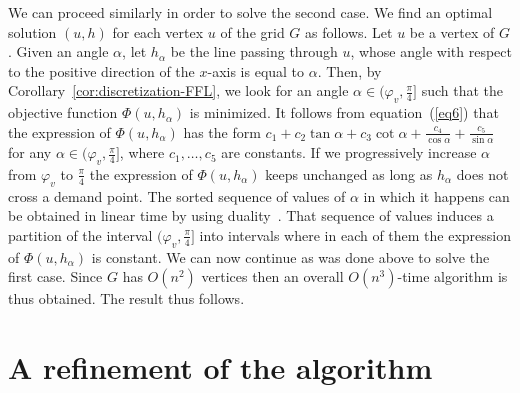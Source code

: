 \documentclass[11pt,a4paper,oneside,onecolumn]{article}
\def\QED{\ensuremath{{\square}}}
\def\markatright#1{\leavevmode\unskip\nobreak\quad\hspace*{\fill}{#1}}
\newenvironment{proof}
{\begin{trivlist}\item[\hskip\labelsep{\bf Proof.}]}
{\markatright{\QED}\end{trivlist}}
\begin{document}
\begin{proof}
We can proceed similarly in order to solve the second case. We find
an optimal solution $(u,h)$ for each vertex $u$ of the grid $G$ as
follows. Let $u$ be a vertex of $G$. Given an angle $\alpha$, let
$h_{\alpha}$ be the line passing through $u$, whose angle with
respect to the positive direction of the $x$-axis is equal to
$\alpha$. Then, by Corollary~\ref{cor:discretization-FFL}, we look
for an angle $\alpha\in(\varphi_v,\frac{\pi}{4}]$ such that the
objective function $\Phi(u,h_{\alpha})$ is minimized. It follows
from equation~(\ref{eq6}) that the expression of
$\Phi(u,h_{\alpha})$ has the form
$c_1+c_2\tan\alpha+c_3\cot\alpha+\frac{c_4}{\cos\alpha}+\frac{c_5}{\sin\alpha}$ for any
$\alpha\in(\varphi_v,\frac{\pi}{4}]$, where $c_1,\ldots,c_5$ are
constants. If we progressively increase $\alpha$ from $\varphi_v$ to
$\frac{\pi}{4}$ the expression of $\Phi(u,h_{\alpha})$ keeps
unchanged as long as $h_{\alpha}$ does not cross a demand point. The
sorted sequence of values of $\alpha$ in which it happens can be
obtained in linear time by using duality~\cite{o-rourke98}. That
sequence of values induces a partition of the interval
$(\varphi_v,\frac{\pi}{4}]$ into intervals where in each of them the
expression of $\Phi(u,h_{\alpha})$ is constant. We can now continue
as was done above to solve the first case. Since $G$ has $O(n^2)$
vertices then an overall $O(n^3)$-time algorithm is thus obtained.
The result thus follows.
\end{proof}

\section{A refinement of the
algorithm}\label{section:refinement}
\end{document}
